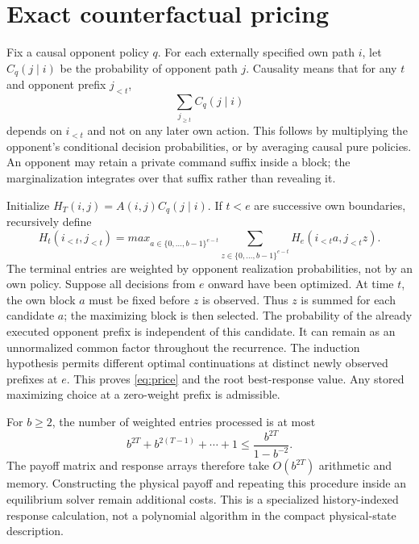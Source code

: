 \section{Exact counterfactual pricing}
Fix a causal opponent policy $q$. For each externally specified own path
$i$, let $C_q(j\mid i)$ be the probability of opponent path $j$. Causality
means that for any $t$ and opponent prefix $j_{<t}$,
\begin{equation}
 \sum_{j_{\ge t}}C_q(j\mid i)
\end{equation}
depends on $i_{<t}$ and not on any later own action. This follows by multiplying
the opponent's conditional decision probabilities, or by averaging causal
pure policies. An opponent may retain a private command suffix inside a
block; the marginalization integrates over that suffix rather than revealing it.

Initialize $H_T(i,j)=A(i,j)C_q(j\mid i)$. If $t<e$ are successive own
boundaries, recursively define
\begin{equation}
 H_t(i_{<t},j_{<t})=max_{a\in\{0,\ldots,b-1\}^{e-t}}
 \sum_{z\in\{0,\ldots,b-1\}^{e-t}}
 H_e(i_{<t}a,j_{<t}z).
 \label{eq:price}
\end{equation}
The terminal entries are weighted by opponent realization probabilities,
not by an own policy. Suppose all decisions from $e$ onward have been optimized.
At time $t$, the own block $a$ must be fixed before $z$ is observed. Thus $z$
is summed for each candidate $a$; the maximizing block is then selected.
The probability of the already executed opponent prefix is independent of
this candidate. It can remain as an unnormalized common factor throughout
the recurrence. The induction hypothesis permits different optimal
continuations at distinct newly observed prefixes at $e$. This proves
\eqref{eq:price} and the root best-response value. Any stored maximizing
choice at a zero-weight prefix is admissible.

For $b\ge2$, the number of weighted entries processed is at most
\[
 b^{2T}+b^{2(T-1)}+\cdots+1\le\frac{b^{2T}}{1-b^{-2}}.
\]
The payoff matrix and response arrays therefore take $O(b^{2T})$ arithmetic
and memory. Constructing the physical payoff and repeating this procedure
inside an equilibrium solver remain additional costs. This is a specialized
history-indexed response calculation, not a polynomial algorithm in the
compact physical-state description.

